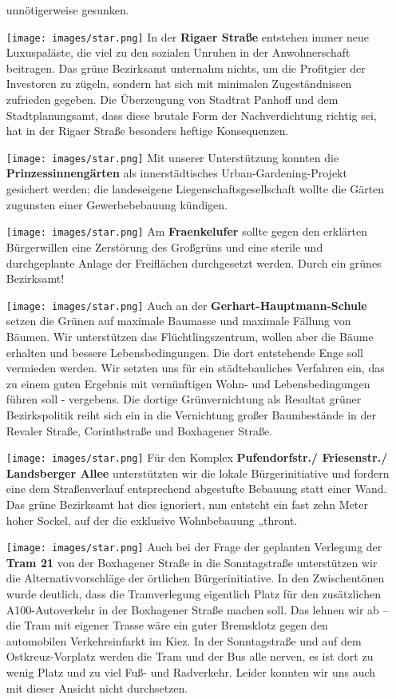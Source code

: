 \documentclass[a4paper,10pt]{article}
\begin{document}
\begin{itemize}
  unnötigerweise gesunken.
  \enlargethispage{-4em}
\item[\texttt{[image: images/star.png]}]
  In der \textbf{Rigaer Straße} entstehen immer neue Luxuspaläste, die viel
  zu den sozialen Unruhen in der Anwohnerschaft beitragen. Das grüne
  Bezirksamt unternahm nichts, um die Profitgier der Investoren zu
  zügeln, sondern hat sich mit minimalen Zugeständnissen zufrieden
  gegeben. Die Überzeugung von Stadtrat Panhoff und dem
  Stadtplanungsamt, dass diese brutale Form der Nachverdichtung richtig
  sei, hat in der Rigaer Straße besonders heftige Konsequenzen.
\item[\texttt{[image: images/star.png]}]
  Mit unserer Unterstützung konnten die \textbf{Prinzessinnengärten} als
  innerstädtisches Urban-Gardening-Projekt gesichert werden; die
  landeseigene Liegenschaftsgesellschaft wollte die Gärten zugunsten
  einer Gewerbebebauung kündigen.
\item[\texttt{[image: images/star.png]}]
  Am \textbf{Fraenkelufer} sollte gegen den erklärten Bürgerwillen eine
  Zerstörung des Großgrüns und eine sterile und durchgeplante Anlage der
  Freiflächen durchgesetzt werden. Durch ein grünes Bezirksamt!
\item[\texttt{[image: images/star.png]}]
  Auch an der \textbf{Gerhart-Hauptmann-Schule} setzen die Grünen auf
  maximale Baumasse und maximale Fällung von Bäumen. Wir unterstützen
  das Flüchtlingszentrum, wollen aber die Bäume erhalten und bessere
  Lebensbedingungen. Die dort entstehende Enge soll vermieden werden.
  Wir setzten uns für ein städtebauliches Verfahren ein, das zu einem
  guten Ergebnis mit vernünftigen Wohn- und Lebensbedingungen führen
  soll - vergebens. Die dortige Grünvernichtung als Resultat grüner
  Bezirkspolitik reiht sich ein in die Vernichtung großer Baumbestände
  in der Revaler Straße, Corinthstraße und Boxhagener Straße.
\item[\texttt{[image: images/star.png]}]
  Für den Komplex \textbf{Pufendorfstr./ Friesenstr./ Landsberger
  Allee} unterstützten wir die lokale Bürgerinitiative und fordern
  eine dem Straßenverlauf entsprechend abgestufte Bebauung statt einer
  Wand. Das grüne Bezirksamt hat dies ignoriert, nun entsteht ein fast
  zehn Meter hoher Sockel, auf der die exklusive Wohnbebauung „thront{\grqq}.
  \clearpage
\item[\texttt{[image: images/star.png]}]
  Auch bei der Frage der geplanten Verlegung der \textbf{Tram 21} von der
  Boxhagener Straße in die Sonntagstraße unterstützen wir die
  Alternativvorschläge der örtlichen Bürgerinitiative. In den
  Zwischentönen wurde deutlich, dass die Tramverlegung eigentlich Platz
  für den zusätzlichen A100-Autoverkehr in der Boxhagener Straße machen
  soll. Das lehnen wir ab -- die Tram mit eigener Trasse wäre ein guter
  Bremsklotz gegen den automobilen Verkehrsinfarkt im Kiez. In der
  Sonntagstraße und auf dem Ostkreuz-Vorplatz werden die Tram und der
  Bus alle nerven, es ist dort zu wenig Platz und zu viel Fuß- und
  Radverkehr. Leider konnten wir uns auch mit dieser Ansicht nicht
  durchsetzen.
\end{itemize}
\end{document}
